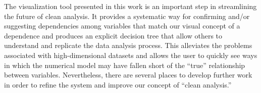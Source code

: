 The visualization tool presented in this work is an important step in 
streamlining the future of clean analysis. It provides a systematic way for 
confirming and/or suggesting dependencies among variables that match our visual 
concept of a dependence and produces an explicit decision tree that allow 
others to understand and replicate the data analysis process. This alleviates 
the problems associated with high-dimensional datasets and allows the 
user to quickly see ways in which the numerical model may have fallen short of 
the ``true'' relationship between variables. Nevertheless, there are several 
places to develop further work in order to refine the system and improve our 
concept of ``clean analysis.''